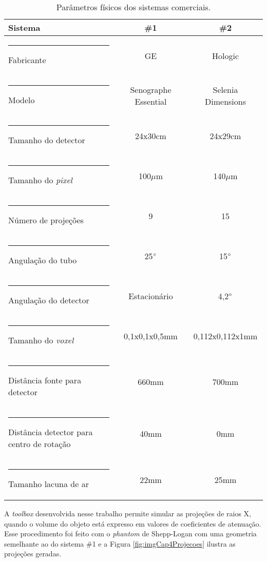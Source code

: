 \begin{table}[htb]
	\centering
	\caption{Parâmetros físicos dos sistemas comerciais.}
	\label{tab:tabCap4ParametrosEquipamentos}
	\begin{tabular}{l|c|c}
		\textbf{Sistema}                            &   \textbf{\#1}   &   \textbf{\#2}\\
		[5pt]
		\hline
		\hline
		\rule[-0.5ex]{-3pt}{3ex}
		Fabricante												& \acs{GE} & Hologic \\ \hline
		\rule[-0.5ex]{-3pt}{3ex}
		Modelo													&  Senographe Essential &  Selenia Dimensions\\ \hline
		\rule[-0.5ex]{-3pt}{3ex}
		Tamanho do detector 						  &      24x30cm  &      24x29cm      \\ \hline
		\rule[-0.5ex]{-3pt}{3ex}
		Tamanho do \textit{pixel}                     &     100$\mu$m  &     140$\mu$m     \\ \hline
		\rule[-0.5ex]{-3pt}{3ex}
		Número de projeções                           &         9 &         15         \\ \hline
		\rule[-0.5ex]{-3pt}{3ex}
		Angulação do tubo                             &    25$\degree$   &    15$\degree$    \\ \hline
		\rule[-0.5ex]{-3pt}{3ex}
		Angulação do detector                         &    Estacionário  &    4,2$\degree$  \\ \hline
		\rule[-0.5ex]{-3pt}{3ex}
		Tamanho do \textit{voxel}                     &   0,1x0,1x0,5mm   &   0,112x0,112x1mm \\ \hline
		\rule[-0.5ex]{-3pt}{3ex}
		Distância fonte para detector                 &       660mm  &       700mm       \\ \hline
		\rule[-0.5ex]{-3pt}{3ex}
		Distância detector para centro de rotação     &        40mm     &        0mm   \\ \hline
		\rule[-0.5ex]{-3pt}{3ex}
		Tamanho lacuna de ar                          &        22mm   &        25mm     \\ \hline
	\end{tabular}
	\vspace{2ex}
\end{table}

A \textit{toolbox} desenvolvida nesse trabalho permite simular as projeções de raios X, quando o volume do objeto está expresso em valores de coeficientes de atenuação. Esse procedimento foi feito com o \textit{phantom} de Shepp-Logan com uma geometria semelhante ao do sistema \#1 e a Figura \ref{fig:imgCap4Projecoes} ilustra as projeções geradas.

